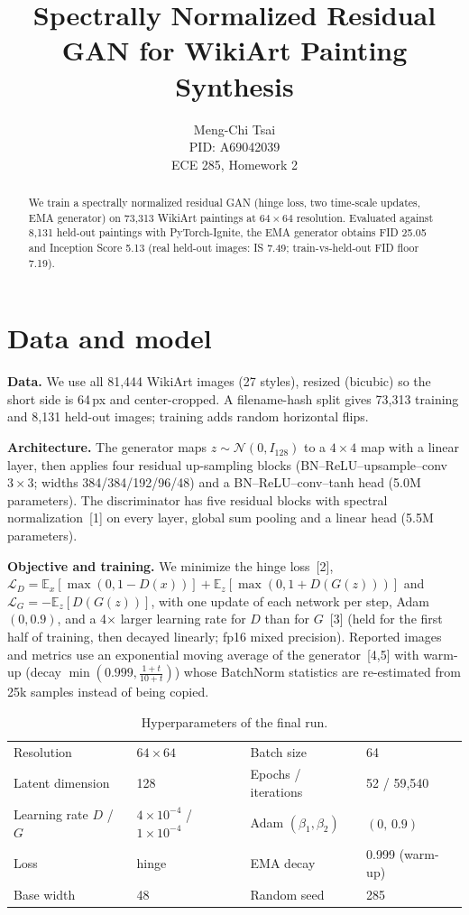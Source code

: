 \documentclass{article}
\title{Spectrally Normalized Residual GAN for WikiArt Painting Synthesis}
\author{Meng-Chi Tsai \\ PID: A69042039 \\ ECE 285, Homework 2}
\begin{document}
\maketitle
\begin{abstract}
We train a spectrally normalized residual GAN (hinge loss, two time-scale updates, EMA generator) on
73{,}313 WikiArt paintings at $64\times64$ resolution. Evaluated against 8{,}131 held-out paintings with
PyTorch-Ignite, the EMA generator obtains FID 25.05 and Inception Score 5.13
(real held-out images: IS 7.49; train-vs-held-out FID floor 7.19).
\end{abstract}

\section{Data and model}
\textbf{Data.} We use all 81{,}444 WikiArt images (27 styles), resized (bicubic) so the short side is 64\,px and
center-cropped. A filename-hash split gives 73{,}313 training and 8{,}131 held-out images; training adds random horizontal flips.

\textbf{Architecture.} The generator maps $z\sim\mathcal N(0,I_{128})$ to a $4{\times}4$ map with a linear layer, then applies four residual
up-sampling blocks (BN--ReLU--upsample--conv$3{\times}3$; widths 384/384/192/96/48) and a BN--ReLU--conv--tanh head (5.0M parameters).
The discriminator has five residual blocks with spectral normalization~[1] on every layer, global sum pooling and a linear head (5.5M parameters).

\textbf{Objective and training.} We minimize the hinge loss~[2],
$\mathcal L_D=\mathbb E_x[\max(0,1-D(x))]+\mathbb E_z[\max(0,1+D(G(z)))]$ and $\mathcal L_G=-\mathbb E_z[D(G(z))]$,
with one update of each network per step, Adam$(0,0.9)$, and a 4$\times$ larger learning rate for $D$ than for $G$~[3]
(held for the first half of training, then decayed linearly; fp16 mixed precision).
Reported images and metrics use an exponential moving average of the generator~[4,5] with warm-up
(decay $\min(0.999,\frac{1+t}{10+t})$) whose BatchNorm statistics are re-estimated from 25k samples instead of being copied.

\begin{table}[!htb]
\centering\small
\caption{Hyperparameters of the final run.}
\begin{tabular}{ll@{\qquad}ll}
\toprule
Resolution & $64\times64$ & Batch size & 64 \\
Latent dimension & 128 & Epochs / iterations & 52 / 59{,}540 \\
Learning rate $D$ / $G$ & $4{\times}10^{-4}$ / $1{\times}10^{-4}$ & Adam $(\beta_1,\beta_2)$ & $(0,\,0.9)$ \\
Loss & hinge & EMA decay & 0.999 (warm-up) \\
Base width & 48 & Random seed & 285 \\
\bottomrule
\end{tabular}
\end{table}
\end{document}
